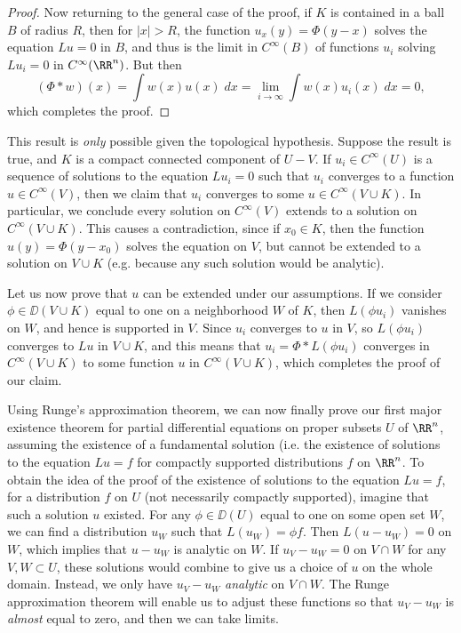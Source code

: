 \begin{proof}
    Now returning to the general case of the proof, if $K$ is contained in a ball $B$ of radius $R$, then for $|x| > R$, the function $u_x(y) = \Phi(y-x)$ solves the equation $Lu = 0$ in $B$, and thus is the limit in $C^\infty(B)$ of functions $u_i$ solving $Lu_i = 0$ in $C^\infty(\RR^n)$. But then
    \[ (\Phi * w)(x) = \int w(x) u(x)\; dx = \lim_{i \to \infty} \int w(x) u_i(x)\; dx = 0, \]
    which completes the proof.
\end{proof}

\begin{remark}
    This result is \emph{only} possible given the topological hypothesis. Suppose the result is true, and $K$ is a compact connected component of $U - V$. If $u_i \in C^\infty(U)$ is a sequence of solutions to the equation $Lu_i = 0$ such that $u_i$ converges to a function $u \in C^\infty(V)$, then we claim that $u_i$ converges to some $u \in C^\infty(V \cup K)$. In particular, we conclude every solution on $C^\infty(V)$ extends to a solution on $C^\infty(V \cup K)$. This causes a contradiction, since if $x_0 \in K$, then the function $u(y) = \Phi(y - x_0)$ solves the equation on $V$, but cannot be extended to a solution on $V \cup K$ (e.g. because any such solution would be analytic).

    Let us now prove that $u$ can be extended under our assumptions. If we consider $\phi \in \DD(V \cup K)$ equal to one on a neighborhood $W$ of $K$, then $L(\phi u_i)$ vanishes on $W$, and hence is supported in $V$. Since $u_i$ converges to $u$ in $V$, so $L(\phi u_i)$ converges to $Lu$ in $V \cup K$, and this means that $u_i = \Phi * L(\phi u_i)$ converges in $C^\infty(V \cup K)$ to some function $u$ in $C^\infty(V \cup K)$, which completes the proof of our claim.
\end{remark}

Using Runge's approximation theorem, we can now finally prove our first major existence theorem for partial differential equations on proper subsets $U$ of $\RR^n$, assuming the existence of a fundamental solution (i.e. the existence of solutions to the equation $Lu = f$ for compactly supported distributions $f$ on $\RR^n$. To obtain the idea of the proof of the existence of solutions to the equation $Lu = f$, for a distribution $f$ on $U$ (not necessarily compactly supported), imagine that such a solution $u$ existed. For any $\phi \in \DD(U)$ equal to one on some open set $W$, we can find a distribution $u_W$ such that $L(u_W) = \phi f$. Then $L(u - u_W) = 0$ on $W$, which implies that $u - u_W$ is analytic on $W$. If $u_V - u_W = 0$ on $V \cap W$ for any $V,W \subset U$, these solutions would combine to give us a choice of $u$ on the whole domain. Instead, we only have $u_V - u_W$ \emph{analytic} on $V \cap W$. The Runge approximation theorem will enable us to adjust these functions so that $u_V - u_W$ is \emph{almost} equal to zero, and then we can take limits.

